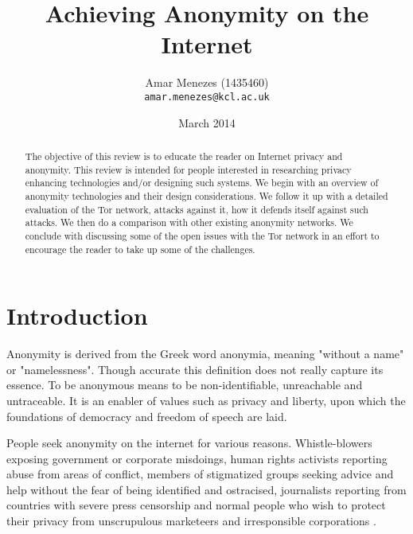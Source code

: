 \documentclass{llncs}
\begin{document}
\author{Amar Menezes (1435460)\\
\texttt{amar.menezes@kcl.ac.uk}}
\title{Achieving Anonymity on the Internet}
\date{March 2014}
\maketitle

\begin{abstract} 
	The objective of this review is to educate the reader on Internet privacy and anonymity. This review is intended for people interested in researching privacy enhancing technologies and/or designing such systems. We begin with an overview of anonymity technologies and their design considerations. We follow it up with a detailed evaluation of the Tor network, attacks against it, how it defends itself against such attacks. We then do a comparison with other existing anonymity networks. We conclude with discussing some of the open issues with the Tor network in an effort to encourage the reader to take up some of the challenges. 
\end{abstract}

\section{Introduction} \label{intro}
Anonymity is derived from the Greek word anonymia, meaning "without a name" or "namelessness". Though accurate this definition does not really capture its essence. To be anonymous means to be non-identifiable, unreachable and untraceable. It is an enabler of values such as privacy and liberty, upon which the foundations of democracy and freedom of speech are laid.

People seek anonymity on the internet for various reasons. Whistle-blowers exposing government or corporate misdoings, human rights activists reporting abuse from areas of conflict, members of stigmatized groups seeking advice and help without the fear of being identified and ostracised, journalists reporting from countries with severe press censorship and normal people who wish to protect their privacy from unscrupulous marketeers and irresponsible corporations \cite{seekanonymity}.
\end{document}
